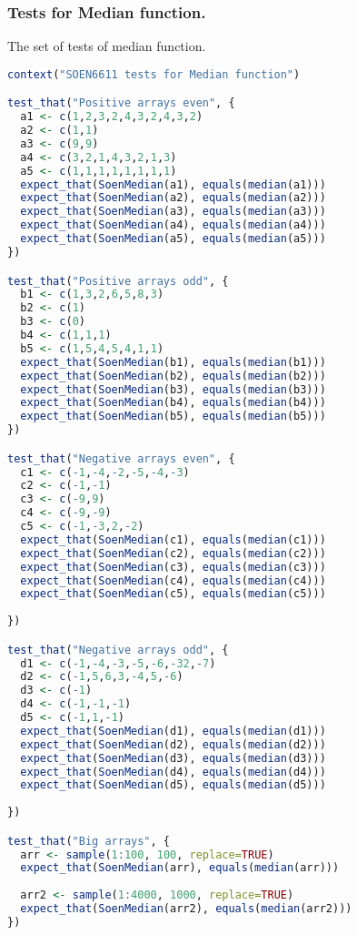 \documentclass[12pt]{article}
\begin{document}
\subsubsection{Tests for Median function.}
The set of tests of median function.
\begin{lstlisting}[language=R]
context("SOEN6611 tests for Median function")

test_that("Positive arrays even", {
  a1 <- c(1,2,3,2,4,3,2,4,3,2)
  a2 <- c(1,1)
  a3 <- c(9,9)
  a4 <- c(3,2,1,4,3,2,1,3)
  a5 <- c(1,1,1,1,1,1,1,1)
  expect_that(SoenMedian(a1), equals(median(a1)))
  expect_that(SoenMedian(a2), equals(median(a2)))
  expect_that(SoenMedian(a3), equals(median(a3)))
  expect_that(SoenMedian(a4), equals(median(a4)))
  expect_that(SoenMedian(a5), equals(median(a5)))
})

test_that("Positive arrays odd", {
  b1 <- c(1,3,2,6,5,8,3)
  b2 <- c(1)
  b3 <- c(0)
  b4 <- c(1,1,1)
  b5 <- c(1,5,4,5,4,1,1)
  expect_that(SoenMedian(b1), equals(median(b1)))
  expect_that(SoenMedian(b2), equals(median(b2)))
  expect_that(SoenMedian(b3), equals(median(b3)))
  expect_that(SoenMedian(b4), equals(median(b4)))
  expect_that(SoenMedian(b5), equals(median(b5)))
})

test_that("Negative arrays even", {
  c1 <- c(-1,-4,-2,-5,-4,-3)
  c2 <- c(-1,-1)
  c3 <- c(-9,9)
  c4 <- c(-9,-9)
  c5 <- c(-1,-3,2,-2)
  expect_that(SoenMedian(c1), equals(median(c1)))
  expect_that(SoenMedian(c2), equals(median(c2)))
  expect_that(SoenMedian(c3), equals(median(c3)))
  expect_that(SoenMedian(c4), equals(median(c4)))
  expect_that(SoenMedian(c5), equals(median(c5)))
  
})

test_that("Negative arrays odd", {
  d1 <- c(-1,-4,-3,-5,-6,-32,-7)
  d2 <- c(-1,5,6,3,-4,5,-6)
  d3 <- c(-1)
  d4 <- c(-1,-1,-1)
  d5 <- c(-1,1,-1)
  expect_that(SoenMedian(d1), equals(median(d1)))
  expect_that(SoenMedian(d2), equals(median(d2)))
  expect_that(SoenMedian(d3), equals(median(d3)))
  expect_that(SoenMedian(d4), equals(median(d4)))
  expect_that(SoenMedian(d5), equals(median(d5)))
  
})

test_that("Big arrays", {
  arr <- sample(1:100, 100, replace=TRUE)
  expect_that(SoenMedian(arr), equals(median(arr)))
  
  arr2 <- sample(1:4000, 1000, replace=TRUE)
  expect_that(SoenMedian(arr2), equals(median(arr2)))
})
\end{lstlisting}
\end{document}
